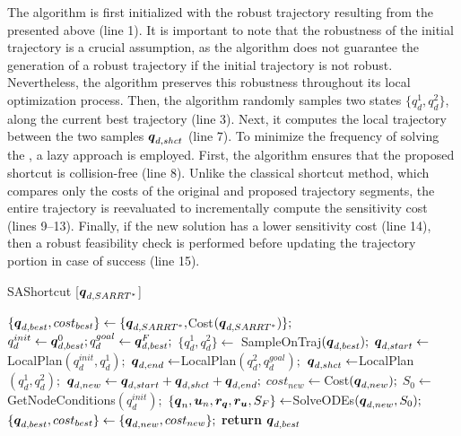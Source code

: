 The algorithm is first initialized with the robust trajectory resulting from the  presented above (line 1).
It is important to note that the robustness of the initial trajectory is a crucial assumption, as the  algorithm does not guarantee the generation of a robust trajectory if the initial trajectory is not robust.
Nevertheless, the algorithm preserves this robustness throughout its local optimization process.
Then, the algorithm randomly samples two states $\{q_d^{1}, q_d^{2}\}$, along the current best trajectory (line 3).
Next, it computes the local trajectory between the two samples $\boldsymbol{q}_{d,shct}$ (line 7).
To minimize the frequency of solving the , a lazy approach is employed.
First, the algorithm ensures that the proposed shortcut is collision-free (line 8). 
Unlike the classical shortcut method, which compares only the costs of the original and proposed trajectory segments, the entire trajectory is reevaluated to incrementally compute the sensitivity cost (lines 9–13).
Finally, if the new solution has a lower sensitivity cost (line 14), then a robust feasibility check is performed before updating the trajectory portion in case of success (line 15).

\begin{algorithm}[t]
    \caption{SAShortcut [$\boldsymbol{q}_{d,SARRT^*}$]}\label{alg:SAshortcut}
    \begin{algorithmic}[1]
        \State $\{\boldsymbol{q}_{d,best}, cost_{best}\} \gets \{\boldsymbol{q}_{d,SARRT^*}, $Cost$(\boldsymbol{q}_{d,SARRT^*}) \};$
        \State $q_d^{init} \gets \boldsymbol{q}_{d,best}^0; q_d^{goal} \gets \boldsymbol{q}_{d,best}^F;$
            \State $\{q_d^{1}, q_d^{2}\} \gets$ SampleOnTraj$(\boldsymbol{q}_{d,best});$
            \State $\boldsymbol{q}_{d,start} \gets $LocalPlan$(q_d^{init}, q_d^{1});$
            \State $\boldsymbol{q}_{d,end} \gets $LocalPlan$(q_d^{2}, q_d^{goal});$
            \State $\boldsymbol{q}_{d,shct} \gets $LocalPlan$(q_d^{1}, q_d^{2});$
                \State $\boldsymbol{q}_{d,new} \gets \boldsymbol{q}_{d,start}+\boldsymbol{q}_{d,shct}+\boldsymbol{q}_{d,end};$
                \State $cost_{new} \gets $Cost$(\boldsymbol{q}_{d,new});$
                    \State $S_0 \gets $GetNodeConditions$(q_d^{init});$
                    \State $\{\boldsymbol{q}_n, \boldsymbol{u}_n, \boldsymbol{r_q}, \boldsymbol{r_u}, S_F\}  \gets $SolveODEs$(\boldsymbol{q}_{d,new}, S_0);$
                        \State $\{\boldsymbol{q}_{d,best}, cost_{best}\} \gets \{\boldsymbol{q}_{d,new}, cost_{new}\};$
                    \EndIf
                \EndIf
            \EndIf
        \EndWhile
    \State \textbf{return} $\boldsymbol{q}_{d,best}$
    \end{algorithmic}
\end{algorithm}

